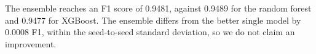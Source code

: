 The ensemble reaches an F1 score of 0.9481, against 0.9489 for the random forest and 0.9477 for XGBoost. The ensemble differs from the better single model by 0.0008 F1, within the seed-to-seed standard deviation, so we do not claim an improvement.
